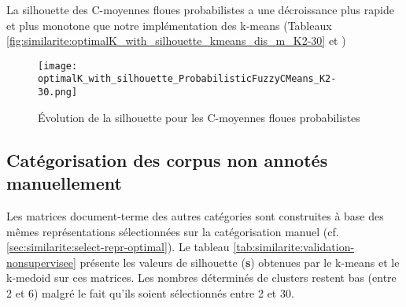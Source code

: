 La silhouette des C-moyennes floues probabilistes a une décroissance plus rapide et plus monotone que notre implémentation des k-means (Tableaux \ref{fig:similarite:optimalK_with_silhouette_kmeans_dis_m_K2-30} et )

\begin{figure}[!htb]
	\centering \texttt{[image: optimalK\_with\_silhouette\_ProbabilisticFuzzyCMeans\_K2-30.png]} \hfil
	
	\caption{Évolution de la silhouette pour les C-moyennes floues probabilistes}\label{fig:similarite:optimalK_with_silhouette_ProbabilisticFuzzyCMeans_K2-30}
\end{figure}

\subsection{Catégorisation des corpus non annotés manuellement}
Les matrices document-terme des autres catégories sont construites à base des mêmes représentations sélectionnées sur la catégorisation manuel (cf. \ref{sec:similarite:select-repr-optimal}). Le tableau \ref{tab:similarite:validation-nonsupervisee} présente les valeurs de silhouette (\textbf{s}) obtenues par le k-means et le k-medoid sur ces matrices. Les nombres déterminés de clusters restent bas (entre 2 et 6) malgré le fait qu'ils soient sélectionnés entre 2 et 30. 
\newlength{\mrcell}
\setlength{\mrcell}{0.8cm}
